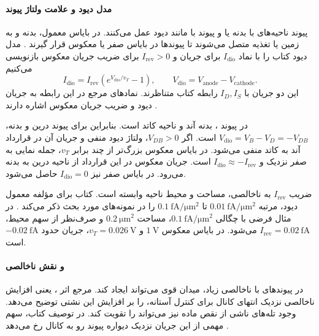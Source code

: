 \paragraph*{مدل دیود و علامت ولتاژ پیوند}
پیوند ناحیه‌های  با بدنه یا  و پیوند
 با  مانند دیود عمل می‌کنند.
در بایاس معمول، بدنه و  به زمین یا تغذیه متصل می‌شوند تا
پیوندها در بایاس صفر یا معکوس قرار گیرند
\cite[بخش  و شکل ]{weste}.
مدل دیود کتاب را با نماد \(I_{\mathrm{dio}}\) برای جریان و
\(I_{\mathrm{rev}}>0\) برای ضریب جریان معکوس بازنویسی می‌کنیم
\begin{equation}
 I_{\mathrm{dio}}=I_{\mathrm{rev}}
 \left(e^{V_{\mathrm{dio}}/v_T}-1\right),\qquad
 V_{\mathrm{dio}}=V_{\mathrm{anode}}-V_{\mathrm{cathode}}.
 \label{eq:junction-diode-model}
\end{equation}
این دو جریان با \(I_D,I_S\) رابطه  کتاب متناظرند.
نمادهای مرجع در این رابطه به جریان دیود و ضریب جریان معکوس اشاره
دارند \cite[صفحه ۸۴ و پانوشت آن]{weste}\cite[اسلاید ۲۶]{nonideal}.

در پیوند ، بدنه  آند و ناحیه
 کاتد است. بنابراین برای پیوند درین و بدنه،
\(V_{\mathrm{dio}}=V_B-V_D=-V_{DB}\) است.
اگر \(V_{DB}>0\)، ولتاژ دیود منفی و جریان آن در قرارداد آند به
کاتد منفی می‌شود. در بایاس معکوس بزرگ‌تر از چند برابر \(v_T\)،
جمله نمایی به صفر نزدیک و
\(I_{\mathrm{dio}}\approx-I_{\mathrm{rev}}\) است.
جریان معکوس در این قرارداد از ناحیه درین به بدنه می‌رود.
در بایاس صفر نیز \(I_{\mathrm{dio}}=0\) حاصل می‌شود.

ضریب \(I_{\mathrm{rev}}\) به ناخالصی، مساحت و محیط ناحیه
 وابسته است. کتاب برای مؤلفه معمول دیود، مرتبه
\(\qty{0.01}{\femto\ampere\per\micro\metre\squared}\) تا
\(\qty{0.1}{\femto\ampere\per\micro\metre\squared}\) را در
نمونه‌های مورد بحث ذکر می‌کند \cite[صفحه ۸۴]{weste}.
در مثال فرضی با چگالی \(\qty{0.1}{\femto\ampere\per\micro\metre\squared}\)،
مساحت \(\qty{0.2}{\micro\metre\squared}\) و صرف‌نظر از سهم محیط،
\(I_{\mathrm{rev}}=\qty{0.02}{\femto\ampere}\) می‌شود.
در بایاس معکوس \(\qty{1}{\volt}\) و
\(v_T=\qty{0.026}{\volt}\)، جریان حدود
\(-\qty{0.02}{\femto\ampere}\) است.

\paragraph*{ و نقش ناخالصی}
در پیوندهای با ناخالصی زیاد، میدان قوی می‌تواند
 ایجاد کند.
مرجع اثر ، یعنی افزایش ناخالصی نزدیک انتهای کانال
برای کنترل آستانه، را بر افزایش این نشتی توضیح می‌دهد.
وجود تله‌های ناشی از نقص ماده نیز می‌تواند
 را تقویت کند.
در توصیف کتاب، سهم مهمی از این جریان نزدیک دیواره پیوند رو به
کانال رخ می‌دهد \cite[صفحه ۸۴]{weste}\cite[اسلاید ۲۷]{nonideal}.

